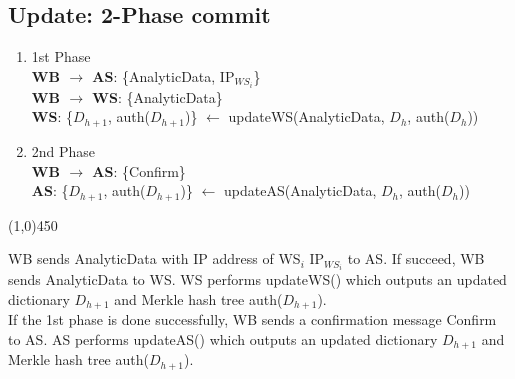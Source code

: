 \subsection{Update: 2-Phase commit}
\begin{framed}
\begin{enumerate}
\item{1st Phase}\\
\textbf{WB $\rightarrow$ AS}: \textsf{\{AnalyticData, IP$_{WS_i}$\}}	\\
\textbf{WB $\rightarrow$ WS}: \textsf{\{AnalyticData\}}	\\
\textbf{WS}: \textsf{\{$D_{h+1}$, auth($D_{h+1}$)\} $\leftarrow$ updateWS(AnalyticData, $D_h$, auth($D_h$))}

\item{2nd Phase}\\
\textbf{WB $\rightarrow$ AS}: \textsf{\{Confirm\}}	\\
\textbf{AS}: \textsf{\{$D_{h+1}$, auth($D_{h+1}$)\} $\leftarrow$ updateAS(AnalyticData, $D_h$, auth($D_h$))}
\end{enumerate}
\line(1,0){450}

\noindent
\textsf{WB} sends \textsf{AnalyticData} with IP address of \textsf{WS$_i$} \textsf{IP$_{WS_i}$} to \textsf{AS}. 
If succeed, \textsf{WB} sends \textsf{AnalyticData} to \textsf{WS}. 
\textsf{WS} performs \textsf{updateWS()} which outputs an updated dictionary \textsf{$D_{h+1}$} and Merkle hash tree \textsf{auth($D_{h+1}$)}.\\
If the 1st phase is done successfully, \textsf{WB} sends a confirmation message \textsf{Confirm} to \textsf{AS}. 
\textsf{AS} performs \textsf{updateAS()} which outputs an updated dictionary \textsf{$D_{h+1}$} and Merkle hash tree \textsf{auth($D_{h+1}$)}.
\end{framed}


